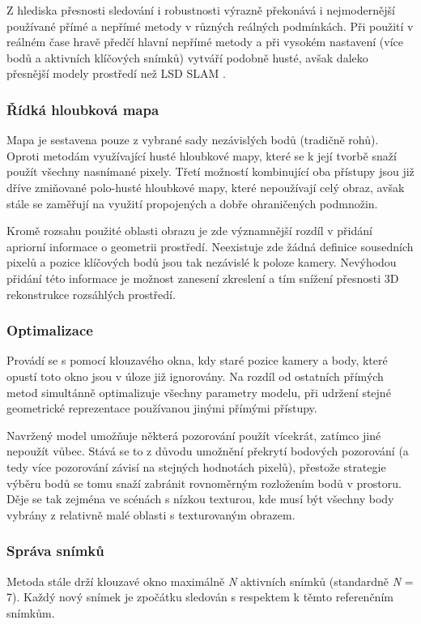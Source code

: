 \documentclass[12pt,a4paper]{article}
\begin{document}
Z hlediska přesnosti sledování i robustnosti výrazně překonává i nejmodernější použí\-vané přímé a nepřímé metody v různých reálných podmínkách. Při použití v reálném čase hravě předčí hlavní nepřímé metody a při vysokém nastavení (více bodů a aktivních klíčových snímků) vytváří podobně husté, avšak daleko přesnější modely prostředí než LSD SLAM \cite{Engel2018_DSO}.

\subsubsection*{Řídká hloubková mapa} Mapa je sestavena pouze z vybrané sady nezávislých bodů (tradičně rohů). Oproti metodám využívající husté hloubkové mapy, které se k její tvorbě snaží použít všechny nasnímané pixely. Třetí možností kombinující oba přístupy jsou již dříve zmiňované polo-husté hloubkové mapy, které nepoužívají celý obraz, avšak stále se zaměřují na využití propojených a dobře ohraničených podmnožin. 

Kromě rozsahu použité oblasti obrazu je zde významnější rozdíl v přidání apriorní informace o geometrii prostředí. Neexistuje zde žádná definice sousedních pixelů a pozice klíčových bodů jsou tak nezávislé k poloze kamery. Nevýhodou přidání této informace je možnost zanesení zkreslení a tím snížení přesnosti 3D rekonstrukce rozsáhlých prostředí. 

\subsubsection*{Optimalizace} Provádí se s pomocí klouzavého okna, kdy staré pozice kamery a body, které opustí toto okno jsou v úloze již ignorovány. Na rozdíl od ostatních přímých metod simultánně optimalizuje všechny parametry modelu, při udržení stejné geometrické reprezentace používanou jinými přímými přístupy.

Navržený model umožňuje některá pozorování použít vícekrát, zatímco jiné nepoužít vůbec. Stává se to z důvodu umožnění překrytí bodových pozorování (a tedy více pozorování závisí na stejných hodnotách pixelů), přestože strategie výběru bodů se tomu snaží zabránit rovnoměrným rozložením bodů v prostoru. Děje se tak zejména ve scénách s nízkou texturou, kde musí být všechny body vybrány z relativně malé oblasti s texturovaným obrazem. 

\subsubsection*{Správa snímků}
Metoda stále drží klouzavé okno maximálně \textit{N} aktivních snímků (standardně \textit{N} = 7). Každý nový snímek je zpočátku sledován s respektem k těmto referenčním snímkům.
\end{document}
